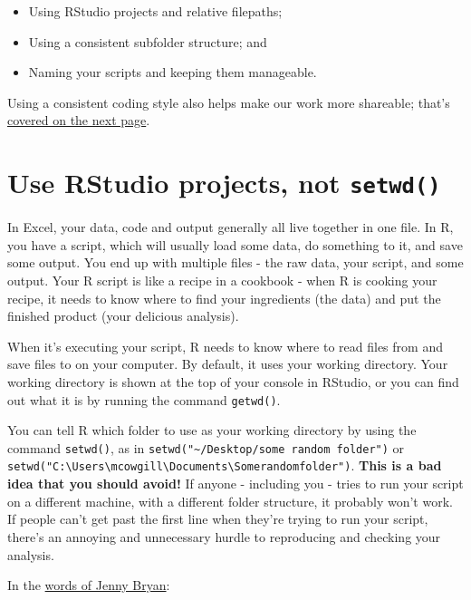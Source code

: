 \documentclass[]{book}
\providecommand{\tightlist}{%
  \setlength{\itemsep}{0pt}\setlength{\parskip}{0pt}}
\begin{document}
\begin{itemize}
\tightlist
\item
  Using RStudio projects and relative filepaths;
\item
  Using a consistent subfolder structure; and
\item
  Naming your scripts and keeping them manageable.
\end{itemize}

Using a consistent coding style also helps make our work more shareable; that's \protect\hyperlink{coding-style}{covered on the next page}.

\hypertarget{rproj}{%
\section{\texorpdfstring{Use RStudio projects, not \texttt{setwd()}}{Use RStudio projects, not setwd()}}\label{rproj}}

In Excel, your data, code and output generally all live together in one file. In R, you have a script, which will usually load some data, do something to it, and save some output. You end up with multiple files - the raw data, your script, and some output. Your R script is like a recipe in a cookbook - when R is cooking your recipe, it needs to know where to find your ingredients (the data) and put the finished product (your delicious analysis).

When it's executing your script, R needs to know where to read files from and save files to on your computer. By default, it uses your working directory. Your working directory is shown at the top of your console in RStudio, or you can find out what it is by running the command \texttt{getwd()}.

You can tell R which folder to use as your working directory by using the command \texttt{setwd()}, as in \texttt{setwd("\textasciitilde{}/Desktop/some\ random\ folder")} or \texttt{setwd("C:\textbackslash{}Users\textbackslash{}mcowgill\textbackslash{}Documents\textbackslash{}Somerandomfolder")}. \textbf{This is a bad idea that you should avoid!} If anyone - including you - tries to run your script on a different machine, with a different folder structure, it probably won't work. If people can't get past the first line when they're trying to run your script, there's an annoying and unnecessary hurdle to reproducing and checking your analysis.

In the \href{https://www.tidyverse.org/articles/2017/12/workflow-vs-script/}{words of Jenny Bryan}:
\end{document}
